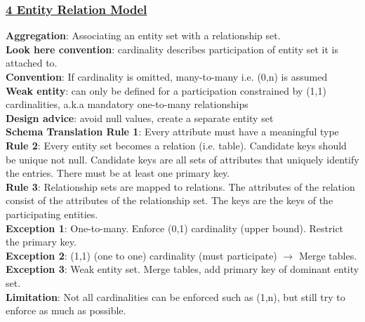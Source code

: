 \documentclass{article}
\begin{document}
{\begin{multicols*}{3}
\subsubsection*{\underline{4 Entity Relation Model}}
\textbf{Aggregation}: Associating an entity set with a relationship set. \\
\textbf{Look here convention}: cardinality describes participation of entity set it is attached to.\\
\textbf{Convention}: If cardinality is omitted, many-to-many i.e. (0,n) is assumed\\
\textbf{Weak entity}: can only be defined for a participation constrained by (1,1) cardinalities, a.k.a mandatory one-to-many relationships \\
\textbf{Design advice}: avoid null values, create a separate entity set\\
\textbf{Schema Translation Rule 1}: Every attribute must have a meaningful type\\
\textbf{Rule 2}: Every entity set becomes a relation (i.e. table). Candidate keys should be unique not null. Candidate keys are all sets of attributes that uniquely identify the entries. There must be at least one primary key. \\
\textbf{Rule 3}: Relationship sets are mapped to relations. The attributes of the relation consist of the attributes of the relationship set. The keys are the keys of the participating entities. \\
\textbf{Exception 1}: One-to-many. Enforce (0,1) cardinality (upper bound). Restrict the primary key. \\
\textbf{Exception 2}: (1,1) (one to one) cardinality (must participate) $\to$ Merge tables. \\
\textbf{Exception 3}: Weak entity set. Merge tables, add primary key of dominant entity set. \\
\textbf{Limitation}: Not all cardinalities can be enforced such as (1,n), but still try to enforce as much as possible.

\end{multicols*}}
\end{document}
